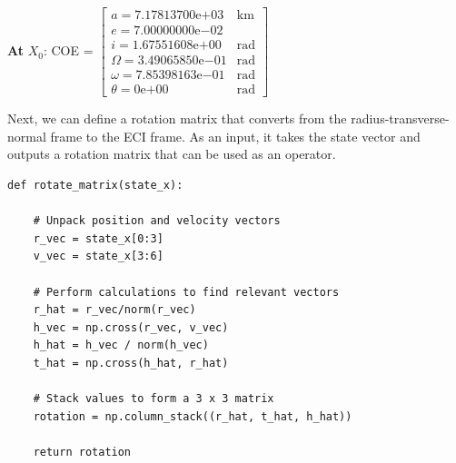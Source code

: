 \documentclass[12pt,twocolumn]{article}  %
\begin{document}
\begin{center}
    \textbf{At } $X_0$:
    COE =
    $\begin{bmatrix}
    a = 7.17813700\mathrm{e}{+03}  & \text{km}\\
    e =  7.00000000\mathrm{e}{-02} \\
    i = 1.67551608\mathrm{e}{+00} & \text{rad}\\
    \Omega = 3.49065850\mathrm{e}{-01} & \text{rad}\\
    \omega = 7.85398163\mathrm{e}{-01} & \text{rad}\\
    \theta = 0\mathrm{e}{+00} & \text{rad}
    \end{bmatrix}$  
\end{center}

Next, we can define a rotation matrix that converts from the radius-transverse-normal frame to the ECI frame.
As an input, it takes the state vector and outputs a rotation matrix that can be used as an operator.
\begin{lstlisting}
def rotate_matrix(state_x):
    
    # Unpack position and velocity vectors
    r_vec = state_x[0:3]
    v_vec = state_x[3:6]
    
    # Perform calculations to find relevant vectors
    r_hat = r_vec/norm(r_vec)
    h_vec = np.cross(r_vec, v_vec)
    h_hat = h_vec / norm(h_vec)  
    t_hat = np.cross(h_hat, r_hat)  
    
    # Stack values to form a 3 x 3 matrix 
    rotation = np.column_stack((r_hat, t_hat, h_hat))
    
    return rotation
\end{lstlisting}
\end{document}
